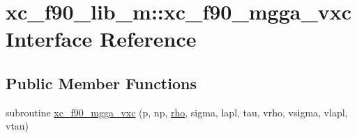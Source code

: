 \hypertarget{interfacexc__f90__lib__m_1_1xc__f90__mgga__vxc}{\section{xc\-\_\-f90\-\_\-lib\-\_\-m\-:\-:xc\-\_\-f90\-\_\-mgga\-\_\-vxc Interface Reference}
\label{interfacexc__f90__lib__m_1_1xc__f90__mgga__vxc}
}
\subsection*{Public Member Functions}
\begin{DoxyCompactItemize}
\item 
subroutine \hyperlink{interfacexc__f90__lib__m_1_1xc__f90__mgga__vxc_a7e6fa02a6cfc63515529f7cb1f14f295}{xc\-\_\-f90\-\_\-mgga\-\_\-vxc} (p, np, \hyperlink{md_8h_a52b35cee8a5db846ce98f4904e1c8b13}{rho}, sigma, lapl, tau, vrho, vsigma, vlapl, vtau)
\end{DoxyCompactItemize}


